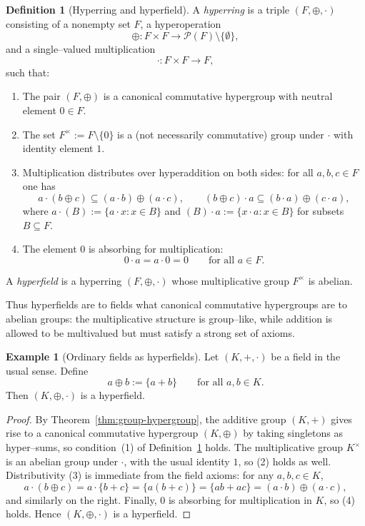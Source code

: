\documentclass[11pt]{amsart}
\numberwithin{equation}{section}
\theoremstyle{definition}
\newtheorem{definition}[theorem]{Definition}
\newtheorem{example}[theorem]{Example}
\theoremstyle{remark}
\begin{document}
\begin{definition}[Hyperring and hyperfield]\label{def:hyperfield}
A \emph{hyperring} is a triple $(F,\oplus,\cdot)$ consisting of a
nonempty set $F$, a hyperoperation
\[
  \oplus : F\times F \longrightarrow
           \mathcal{P}(F)\setminus\{\emptyset\},
\]
and a single–valued multiplication
\[
  \cdot : F\times F \longrightarrow F,
\]
such that:
\begin{enumerate}
  \item The pair $(F,\oplus)$ is a canonical commutative hypergroup
        with neutral element $0\in F$.
  \item The set $F^\times := F\setminus\{0\}$ is a (not necessarily
        commutative) group under $\cdot$ with identity element $1$.
  \item Multiplication distributes over hyperaddition on both sides:
        for all $a,b,c\in F$ one has
  \[
    a\cdot(b\oplus c)
    \subseteq (a\cdot b)\oplus(a\cdot c),
    \qquad
    (b\oplus c)\cdot a
    \subseteq (b\cdot a)\oplus(c\cdot a),
  \]
  where $a\cdot(B):=\{a\cdot x : x\in B\}$ and
  $(B)\cdot a := \{x\cdot a : x\in B\}$ for subsets $B\subseteq F$.
  \item The element $0$ is absorbing for multiplication:
  \[
    0\cdot a = a\cdot 0 = 0
    \qquad\text{for all }a\in F.
  \]
\end{enumerate}
A \emph{hyperfield} is a hyperring $(F,\oplus,\cdot)$ whose
multiplicative group $F^\times$ is abelian.
\end{definition}

Thus hyperfields are to fields what canonical commutative hypergroups
are to abelian groups: the multiplicative structure is group–like,
while addition is allowed to be multivalued but must satisfy a strong
set of axioms.

\begin{example}[Ordinary fields as hyperfields]\label{ex:field-as-hyperfield}
Let $(K,+,\cdot)$ be a field in the usual sense.  Define
\[
  a\oplus b := \{a+b\}
  \qquad\text{for all }a,b\in K.
\]
Then $(K,\oplus,\cdot)$ is a hyperfield.
\end{example}

\begin{proof}
By Theorem~\ref{thm:group-hypergroup}, the additive group $(K,+)$
gives rise to a canonical commutative hypergroup $(K,\oplus)$ by
taking singletons as hyper–sums, so condition~(1) of
Definition~\ref{def:hyperfield} holds.  The multiplicative group
$K^\times$ is an abelian group under $\cdot$, with the usual identity
$1$, so (2) holds as well.  Distributivity (3) is immediate from the
field axioms: for any $a,b,c\in K$,
\[
  a\cdot(b\oplus c) = a\cdot\{b+c\} = \{a(b+c)\}
                   = \{ab+ac\}
                   = (a\cdot b)\oplus(a\cdot c),
\]
and similarly on the right.  Finally, $0$ is absorbing for
multiplication in $K$, so (4) holds.  Hence $(K,\oplus,\cdot)$ is a
hyperfield.
\end{proof}
\end{document}
